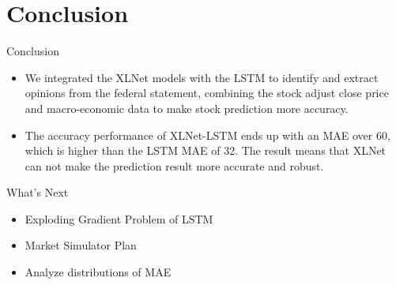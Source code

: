 \documentclass[14pt,aspectratio=169]{beamer}
\newcommand{\CC}{Conclusion}
\begin{document}
\section{\CC}
\begin{frame}{\CC}
    \begin{itemize}
        \item We integrated the XLNet models with the LSTM to identify and extract opinions from the federal statement, combining the stock adjust close price and macro-economic data to make stock prediction more accuracy.
        \item The accuracy performance of XLNet-LSTM ends up with an MAE over 60, which is higher than the LSTM MAE of 32. The result means that XLNet can not make the prediction result more accurate and robust.
    \end{itemize}
\end{frame}

\begin{frame}{What's Next}
    \begin{itemize}
        \item Exploding Gradient Problem of LSTM
        \item Market Simulator Plan
        \item Analyze distributions of MAE
    \end{itemize}
\end{frame}{}
\end{document}
